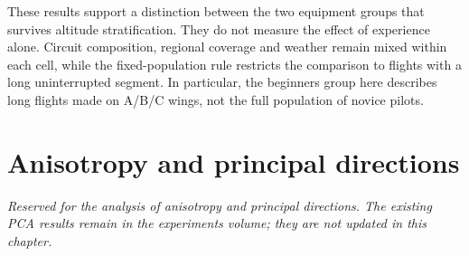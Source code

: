 These results support a distinction between the two equipment groups that survives
altitude stratification. They do not measure the effect of experience alone.
Circuit composition, regional coverage and weather remain mixed within each cell,
while the fixed-population rule restricts the comparison to flights with a long
uninterrupted segment. In particular, the beginners group here describes long
flights made on A/B/C wings, not the full population of novice pilots.
\FloatBarrier

\section{Anisotropy and principal directions}
\label{sec:fixed-anisotropy}
\emph{Reserved for the analysis of anisotropy and principal directions. The existing
PCA results remain in the experiments volume; they are not updated in this chapter.}
